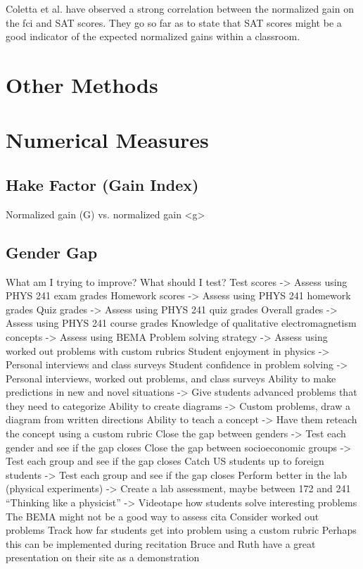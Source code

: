 Coletta et al. have observed a strong correlation between the normalized gain on the \gls{fci} and SAT scores. They go so far as to state that SAT scores might be a good indicator of the expected normalized gains within a classroom\cite{coletta2007}.

\section{Other Methods}

\section{Numerical Measures}

\subsection{Hake Factor (Gain Index)}

Normalized gain (G) vs. normalized gain <g>

\subsection{Gender Gap}

What am I trying to improve? What should I test?
Test scores -> Assess using PHYS 241 exam grades
Homework scores -> Assess using PHYS 241 homework grades
Quiz grades -> Assess using PHYS 241 quiz grades
Overall grades -> Assess using PHYS 241 course grades
Knowledge of qualitative electromagnetism concepts -> Assess using BEMA
Problem solving strategy -> Assess using worked out problems with custom rubrics
Student enjoyment in physics -> Personal interviews and class surveys
Student confidence in problem solving -> Personal interviews, worked out problems, and class surveys
Ability to make predictions in new and novel situations -> Give students advanced problems that they need to categorize
Ability to create diagrams -> Custom problems, draw a diagram from written directions
Ability to teach a concept -> Have them reteach the concept using a custom rubric
Close the gap between genders -> Test each gender and see if the gap closes
Close the gap between socioeconomic groups -> Test each group and see if the gap closes
Catch US students up to foreign students -> Test each group and see if the gap closes
Perform better in the lab (physical experiments) -> Create a lab assessment, maybe between 172 and 241
“Thinking like a physicist” -> Videotape how students solve interesting problems
The BEMA might not be a good way to assess \gls{cita}
Consider worked out problems
Track how far students get into problem using a custom rubric
Perhaps this can be implemented during recitation
Bruce and Ruth have a great presentation on their site as a demonstration

